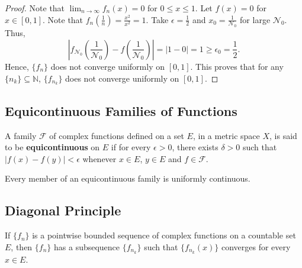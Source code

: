 \documentclass[letterpaper, reqno,11pt]{article}
\newcommand{\NN}{\mathbb{N}}
\begin{document}
\begin{enumerate}
\begin{enumerate}
\begin{proof}
      Note that $\lim_{n \to \infty} f_n(x) = 0$ for $0 \leq x \leq 1$. Let $f(x) = 0$ for $x \in [0, 1]$. Note that $f_n\left(\frac{1}{n}\right) = \frac{x^2}{x^2} = 1$. Take $\epsilon = \frac{1}{2}$ and $x_0 = \frac{1}{\mathcal N_0}$ for large $\mathcal N_0$. Thus,
      $$ \left|f_{\mathcal N_0}\left(\frac{1}{\mathcal N_0}\right) - f\left(\frac{1}{\mathcal N_0}\right)\right| = |1 - 0| = 1 \geq \epsilon_0 = \frac{1}{2}. $$
      Hence, $\{ f_n \}$ does not converge uniformly on $[0, 1]$. This proves that for any $\{ n_k \} \subseteq \NN$, $\{ f_{n_k} \}$ does not converge uniformly on $[0, 1]$.
    \end{proof}
  \end{enumerate}
\end{enumerate}

\subsection{Equicontinuous Families of Functions}

\begin{defn}
  \normalfont A family $\mathcal F$ of complex functions defined on a set $E$, in a metric space $X$, is said to be {\bf equicontinuous} on $E$ if for every $\epsilon > 0$, there exists $\delta > 0$ such that $|f(x) - f(y)| < \epsilon$ whenever $x \in E$, $y \in E$ and $f \in \mathcal F$.
\end{defn}

\begin{remark}
  \normalfont Every member of an equicontinuous family is uniformly continuous.
\end{remark}

\subsection{Diagonal Principle}

\begin{thm}
  \normalfont If $\{ f_n \}$ is a pointwise bounded sequence of complex functions on a countable set $E$, then $\{ f_n \}$ has a subsequence $\{ f_{n_k} \}$ such that $\{ f_{n_k}(x) \}$ converges for every $x \in E$.
\end{thm}
\end{document}
